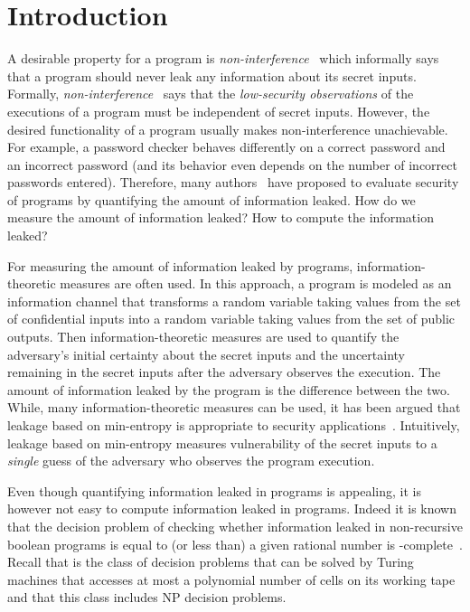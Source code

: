 

\chapter{Introduction}
	\label{CH_Intro}

A desirable property for a program is \emph{non-interference}~\cite{GougenMeseguer,Reynolds} which informally says that a program should  never leak  any information about its secret inputs. Formally, \emph{non-interference}~\cite{GougenMeseguer,Reynolds}
 says that the \emph{low-security observations} of the executions of a program must be independent of secret inputs. However, the desired functionality of a program usually makes non-interference unachievable. For example, a password checker behaves differently on a correct password and an incorrect password   (and its behavior even depends on the number of incorrect passwords
entered).   Therefore,  many authors~\cite{Denning,Gray,Millen,Smith} have proposed to evaluate security of programs by  quantifying the amount of information leaked. How do we measure the amount of information leaked? How to compute the information leaked?


For measuring the amount of information leaked by programs, information-theoretic measures are often used. In this approach, a program is modeled as an information channel that  {transforms} a random variable taking values from the set of confidential inputs into a random variable taking values from the set of public outputs.  Then information-theoretic measures are used to quantify the adversary's initial certainty about the secret inputs and  the  uncertainty remaining in the secret inputs after the adversary observes  the execution.
 The amount of information leaked by the program is the difference between the two. While, many information-theoretic measures can be used, it has been argued that leakage based on min-entropy is appropriate to security applications~\cite{Smith}.   Intuitively, leakage based on min-entropy measures vulnerability of the secret inputs to a \emph{single} guess of the adversary who observes the program execution.
 

Even though quantifying information leaked in programs is appealing, it is however not easy to compute information leaked in programs. Indeed it is known that the decision problem of checking whether information leaked  in non-recursive boolean programs is equal to (or less than) a given rational number is  {\PSpace}-complete~\cite{Jp2,Jp3,POST,Krish}. Recall that 
 {\PSpace} is the class of decision problems that can be solved by Turing machines that accesses at most a  polynomial number of cells on its working tape and that this class includes {\textsf{NP}} decision problems. 
 
